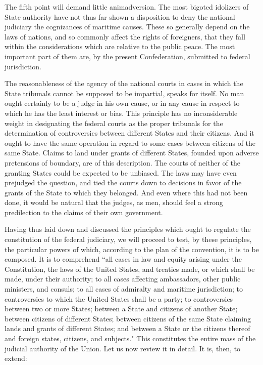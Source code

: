 The fifth point will demand little animadversion. 
The most bigoted idolizers of State authority have not thus far shown a disposition to deny the national judiciary the cognizances of maritime causes. 
These so generally depend on the laws of nations, and so commonly affect the rights of foreigners, that they fall within the considerations which are relative to the public peace. 
The most important part of them are, by the present Confederation, submitted to federal jurisdiction.

The reasonableness of the agency of the national courts in cases in which the State tribunals cannot be supposed to be impartial, speaks for itself. 
No man ought certainly to be a judge in his own cause, or in any cause in respect to which he has the least interest or bias. 
This principle has no inconsiderable weight in designating the federal courts as the proper tribunals for the determination of controversies between different States and their citizens. 
And it ought to have the same operation in regard to some cases between citizens of the same State. 
Claims to land under grants of different States, founded upon adverse pretensions of boundary, are of this description. 
The courts of neither of the granting States could be expected to be unbiased. 
The laws may have even prejudged the question, and tied the courts down to decisions in favor of the grants of the State to which they belonged. 
And even where this had not been done, it would be natural that the judges, as men, should feel a strong predilection to the claims of their own government.

Having thus laid down and discussed the principles which ought to regulate the constitution of the federal judiciary, we will proceed to test, by these principles, the particular powers of which, according to the plan of the convention, it is to be composed. 
It is to comprehend ``all cases in law and equity arising under the Constitution, the laws of the United States, and treaties made, or which shall be made, under their authority; to all cases affecting ambassadors, other public ministers, and consuls; to all cases of admiralty and maritime jurisdiction; to controversies to which the United States shall be a party; to controversies between two or more States; between a State and citizens of another State; between citizens of different States; between citizens of the same State claiming lands and grants of different States; and between a State or the citizens thereof and foreign states, citizens, and subjects." This constitutes the entire mass of the judicial authority of the Union. 
Let us now review it in detail. 
It is, then, to extend:

